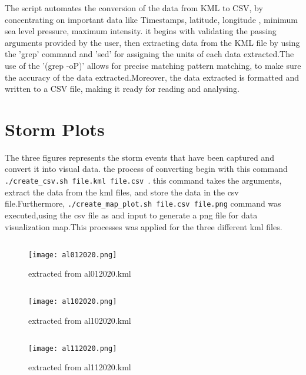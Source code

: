 \documentclass[12pt]{article}
\begin{document}
The script automates the conversion of the data 
from KML to CSV, by concentrating on important data like Timestamps, latitude, longitude , minimum sea level pressure, maximum intensity. it begins with validating the passing arguments provided by the user, then extracting data from the KML file by using the 'grep' command and 'sed' for assigning the units of each data extracted.The use of the '(grep -oP)' allows for precise matching pattern matching, to make sure the accuracy of the data extracted.Moreover, the data extracted is formatted and written to a CSV file, making it ready for reading and analysing. 

\section{Storm Plots}
The three  figures represents the storm events that have been captured and convert it into visual data. the process of converting begin with this command \texttt{./create\_csv.sh file.kml  file.csv }.
this command takes the arguments, extract the data from the kml files,  and store the data in the csv file.Furthermore, \texttt{./create\_map\_plot.sh file.csv file.png} command was executed,using the csv file as and input to generate a png file for data visualization map.This processes was applied for the three different kml files. 

\subsection{}
\begin{figure}[H]
    \centering
    \texttt{[image: al012020.png]}
    \caption{extracted from al012020.kml}
    \label{fig:al012020}
\end{figure}

\subsection{}
\begin{figure} [H]
    \centering
    \texttt{[image: al102020.png]}
    \caption{extracted from al102020.kml}
    \label{fig:al102020}
\end{figure}

\subsection{}
\begin{figure}[H]
    \centering
    \texttt{[image: al112020.png]}
    \caption{extracted from al112020.kml}
    \label{fig:al112020}
    
\end{figure}
\end{document}
